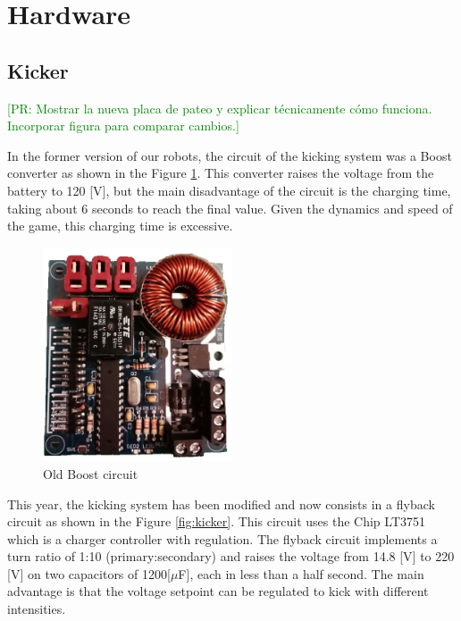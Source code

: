 \documentclass{llncs}
\newcommand{\PR}[1]{{\textcolor{green}{[PR: #1]}}}  %
\newcommand{\TR}[1]{{\textcolor{cyan}{[TR: #1]}}}   %
\newcommand{\RK}[1]{{\textcolor{blue}{[Rk3: #1]}}}  %
\begin{document}
\section{Hardware}

\subsection{Kicker}
\PR{Mostrar la nueva placa de pateo y explicar técnicamente cómo funciona. Incorporar figura para comparar cambios.}

In the former version of our robots, the circuit of the kicking system was a Boost converter as shown in the Figure \ref{fig:old_boost}. This converter raises the voltage from the battery to 120 [V], but the main disadvantage of the circuit is the charging time, taking about 6 seconds to reach the final value. Given the dynamics and speed of the game, this charging time is excessive.

\begin{figure}[h]
    \centering
    \includegraphics[width=0.5\textwidth]{Images/foto_boost.jpg}
    \caption{Old Boost circuit}
    \label{fig:old_boost}
\end{figure}

This year, the kicking system has been modified and now consists in a flyback circuit as shown in the Figure \ref{fig:kicker}. This circuit uses the Chip LT3751 which is a charger controller with regulation. The flyback circuit implements a turn ratio of 1:10 (primary:secondary) and raises the voltage from 14.8 [V] to 220 [V] on two capacitors of 1200[$\mu$F], each in less than a half second. The main advantage is that the voltage setpoint can be regulated to kick with different intensities.
\end{document}
